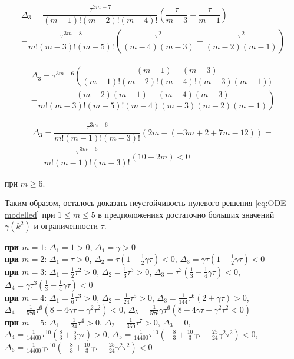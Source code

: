 \begin{multline*}
\Delta_3 = \dfrac{\tau^{3m-7}}{(m-1)!(m-2)!(m-4)!} \left( \dfrac{\tau}{m-3} - \dfrac{\tau}{m-1} \right) \\ - \dfrac{\tau^{3m-8}}{m!(m-3)!(m-5)!} \left( \dfrac{\tau^2}{(m-4)(m-3)} - \dfrac{\tau^2}{(m-2)(m-1)} \right)
\end{multline*}

\begin{multline*}
\Delta_3 = \tau^{3m-6} \left( \dfrac{(m-1) - (m-3)}{(m-1)!(m-2)!(m-4)!(m-3)(m-1))} \right. \\ \left. - \dfrac{(m-2)(m-1) - (m-4)(m-3)}{m!(m-3)!(m-5)!(m-4)(m-3)(m-2)(m-1)} \right)
\end{multline*}

\begin{align*}
\Delta_3 = \dfrac{\tau^{3m-6}}{m!(m-1)!(m-3)!} (2m - (-3m + 2 + 7m - 12)) =\\= \dfrac{\tau^{3m-6}}{m!(m-1)!(m-3)!} (10-2m) < 0
\end{align*}

при $m \geq 6$.

Таким образом, осталось доказать неустойчивость нулевого решения \ref{eq:ODE-modelled} при $1 \leq m \leq 5$ в предположениях достаточно больших значений $\gamma(k^2)$ и ограниченности $\tau$.

\textbf{при $m=1$}: $\Delta_1 = 1 > 0$, $\Delta_1 = \gamma > 0$\\

\textbf{при $m=2$}: $\Delta_1 = \tau > 0$, $\Delta_2 = \tau (1 - \frac{1}{2} \gamma \tau) < 0$, $\Delta_3 = \gamma \tau (1 - \frac{1}{2} \gamma \tau) < 0$\\

\textbf{при $m=3$}: $\Delta_1 = \frac{1}{2} \tau ^2 > 0$, $\Delta_2 = \frac{1}{3} \tau ^3 > 0$, $\Delta_3 = \tau ^3 (\frac{1}{3} - \frac{1}{4} \gamma  \tau ) < 0$, $\Delta_4 = \gamma  \tau ^3 (\frac{1}{3} - \frac{1}{4} \gamma  \tau ) < 0$\\

\textbf{при $m=4$}: $\Delta_1 = \frac{1}{6} \tau ^3 > 0$, $\Delta_2 = \frac{1}{24} \tau ^5 > 0$, $\Delta_3 = \frac{1}{144} \tau^6 (2+\gamma \tau) > 0$, $\Delta_4 = \frac{1}{576} \tau^6 (8 - 4 \gamma \tau - \gamma^2 \tau^2 ) < 0$, $\Delta_5 = \frac{1}{576} \gamma \tau^6 (8 - 4 \gamma \tau - \gamma^2 \tau^2 < 0)$\\

\textbf{при $m=5$}: $\Delta_1 = \frac{1}{24} \tau^4 > 0$, $\Delta_2 = \frac{1}{360} \tau^7 > 0$, $\Delta_3 = 0$,\\$\Delta_4 = \frac{1}{14400} \tau^{10} (\frac{8}{3} + \frac{5}{3} \gamma \tau) > 0$, $\Delta_5 = \frac{1}{14400} \tau^{10} (-\frac{8}{3} + \frac{10}{3} \gamma \tau - \frac{25}{24} \gamma^2 \tau^2) < 0$, $\Delta_6 = \frac{1}{14400} \gamma \tau^{10} (-\frac{8}{3} + \frac{10}{3} \gamma \tau - \frac{25}{24} \gamma^2 \tau^2) < 0$\\

